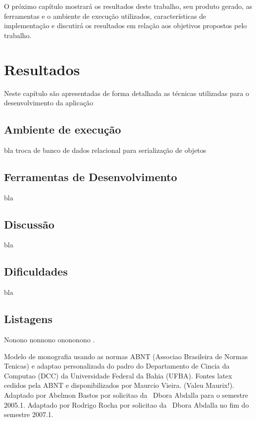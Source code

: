 O próximo capítulo mostrará os resultados deste trabalho, seu produto gerado, as ferramentas e o ambiente de execução utilizados, características
de implementação e discutirá os resultados em relação aos objetivos propostos pelo trabalho.

\chapter{Resultados}
\label{cap:resultados}

Neste capítulo são apresentadas de forma detalhada as técnicas utilizadas para o desenvolvimento da aplicação


\section{Ambiente de execução} \label{sec:ambiente}

bla
troca de banco de dados relacional para serialização de objetos

\section{Ferramentas de Desenvolvimento} \label{sec:ferramentas}

bla

\section{Discussão} \label{sec:discussao}

bla

\section{Dificuldades} \label{sec:dificuldades}

bla



\section{Listagens} \label{sec:listagens}

Nonono nonnono onononono \cite{fowler2000}.

Modelo de monografia usando as normas ABNT (Associao Brasileira de Normas
Tenicas) 
e adaptao personalizada 
do padro do Departamento de Cincia da Computao (DCC) da Universidade
Federal da Bahia (UFBA).
Fontes latex cedidos pela ABNT e disponibilizados por 
Maurcio Vieira. (Valeu Maurix!). Adaptado por Abelmon Bastos por solicitao
da \profa\ Dbora Abdalla para o semestre 2005.1.
Adaptado por Rodrigo Rocha por solicitao da \profa\ Dbora Abdalla no fim
do semestre 2007.1.

